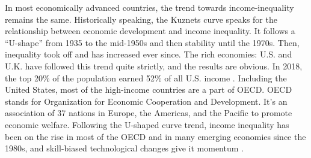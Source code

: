 In most economically advanced countries, the trend towards income-inequality remains the same. Historically speaking, the Kuznets curve speaks for the relationship between economic development and income inequality. It follows a “U-shape” from 1935 to the mid-1950s and then stability until the 1970s. Then, inequality took off and has increased ever since. The rich economies: U.S. and U.K. have followed this trend quite strictly, and the results are obvious. In 2018, the top 20\% of the population earned 52\% of all U.S. income \cite{bureau}. Including the United States, most of the high-income countries are a part of OECD. OECD stands for Organization for Economic Cooperation and Development. It's an association of 37 nations in Europe, the Americas, and the Pacific to promote economic welfare. Following the U-shaped curve trend, income inequality has been on the rise in most of the OECD and in many emerging economies since the 1980s, and skill-biased technological changes give it momentum \cite{goldin2009race}.


